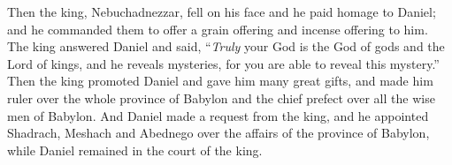 \begin{biblechapter}
 Then the king, Nebuchadnezzar, fell on his face and he paid homage to Daniel; and he commanded them to offer a grain offering and incense offering to him.
\verse The king answered Daniel and said, “\textit{Truly} your God is the God of gods and the Lord of kings, and he reveals mysteries, for you are able to reveal this mystery.”
\verse Then the king promoted Daniel and gave him many great gifts, and made him ruler over the whole province of Babylon and the chief prefect over all the wise men of Babylon.
\verse And Daniel made a request from the king, and he appointed Shadrach, Meshach and Abednego over the affairs of the province of Babylon, while Daniel remained in the court of the king.
\end{biblechapter}

